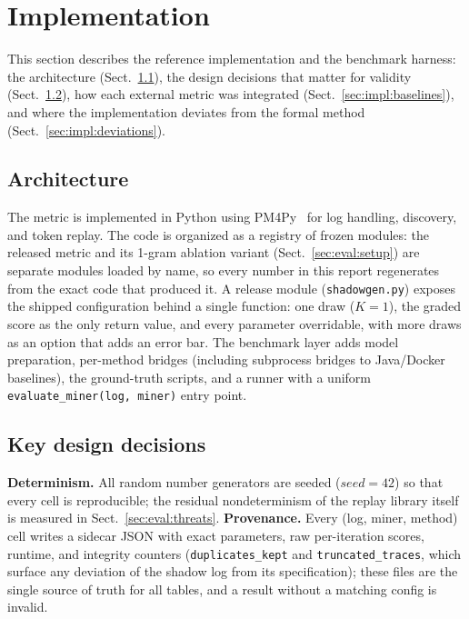 \documentclass[runningheads]{llncs}
\begin{document}
\section{Implementation}
\label{sec:impl}
This section describes the reference implementation and the benchmark harness: the architecture (Sect.~\ref{sec:impl:arch}), the design decisions that matter for validity (Sect.~\ref{sec:impl:decisions}), how each external metric was integrated (Sect.~\ref{sec:impl:baselines}), and where the implementation deviates from the formal method (Sect.~\ref{sec:impl:deviations}).

\subsection{Architecture}
\label{sec:impl:arch}
The metric is implemented in Python using PM4Py~\cite{berti2023pm4pysi} for log handling, discovery, and token replay. The code is organized as a registry of frozen modules: the released metric and its 1-gram ablation variant (Sect.~\ref{sec:eval:setup}) are separate modules loaded by name, so every number in this report regenerates from the exact code that produced it. A release module (\texttt{shadowgen.py}) exposes the shipped configuration behind a single function: one draw ($K{=}1$), the graded score as the only return value, and every parameter overridable, with more draws as an option that adds an error bar. The benchmark layer adds model preparation, per-method bridges (including subprocess bridges to Java/Docker baselines), the ground-truth scripts, and a runner with a uniform \texttt{evaluate\_miner(log, miner)} entry point.

\subsection{Key design decisions}
\label{sec:impl:decisions}
\textbf{Determinism.} All random number generators are seeded ($\mathit{seed}{=}42$) so that every cell is reproducible; the residual nondeterminism of the replay library itself is measured in Sect.~\ref{sec:eval:threats}. \textbf{Provenance.} Every (log, miner, method) cell writes a sidecar JSON with exact parameters, raw per-iteration scores, runtime, and integrity counters (\texttt{duplicates\_kept} and \texttt{truncated\_traces}, which surface any deviation of the shadow log from its specification); these files are the single source of truth for all tables, and a result without a matching config is invalid.
\end{document}
